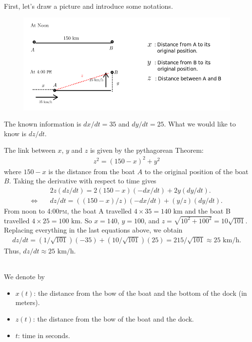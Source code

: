 	\\
	First, let's draw a picture and introduce some notations.
	\begin{figure}[ht]
	\centering
	\includegraphics[scale=.65]{sec28-Prob16-illustration.png}
	\end{figure}
	The known information is $dx/dt = 35$ and $dy/dt = 25$. What we would like to know is $dz/dt$. 
	
	The link between $x$, $y$ and $z$ is given by the pythagorean Theorem:
		\begin{align*}
		z^2 = (150 - x)^2 + y^2
		\end{align*}
	where $150 - x$ is the distance from the boat $A$ to the original position of the boat $B$. Taking the derivative with respect to time gives
		\begin{align*}
		& \quad 2 z (dz/dt) = 2 (150 - x) (-dx/dt) + 2 y (dy/dt) . \\
		\iff & \quad dz/dt = ((150-x)/z) (-dx/dt) + (y/z) (dy/dt) .
		\end{align*}
	From noon to 4:00\textsc{pm}, the boat A travelled $4 \times 35 = 140 \text{ km}$ and the boat B travelled $4 \times 25 = 100 \text{ km}$. So $x = 140$, $y = 100$, and $z = \sqrt{10^2 + 100^2} = 10 \sqrt{101}$. Replacing everything in the last equations above, we obtain
		\begin{align*}
		dz/dt = (1/\sqrt{101}) (-35) + (10/\sqrt{101}) (25) = 215/\sqrt{101} \approx 25 \text{ km/h} .
		\end{align*}
	Thus, $dz/dt \approx 25 \text{ km/h}$.
	
	\spc
	
	\\
	We denote by
		\begin{itemize}
		\item $x(t)$: the distance from the bow of the boat and the bottom of the dock (in meters).
		\item $z(t)$: the distance from the bow of the boat and the dock.
		\item $t$: time in seconds.
		\end{itemize}
	
